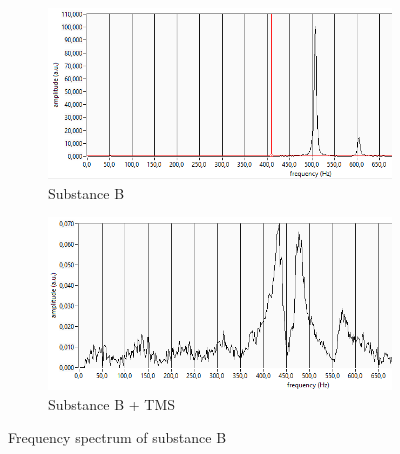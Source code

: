\begin{figure}[!htbp]
  \centering
  \begin{subfigure}[b]{0.47\textwidth}
    \centering
    \includegraphics[width=\textwidth]{./Latex images/B.png}
    \caption{Substance B}
    \label{fig: B}
  \end{subfigure}
  \hfill
  \begin{subfigure}[b]{0.47\textwidth}
    \centering
    \includegraphics[width=\textwidth]{./Latex images/Bp.png}
    \caption{Substance B + TMS}
    \label{fig: B + TMS}
  \end{subfigure}
  \caption{Frequency spectrum of substance B}
  \label{fig:sample B}
\end{figure}


